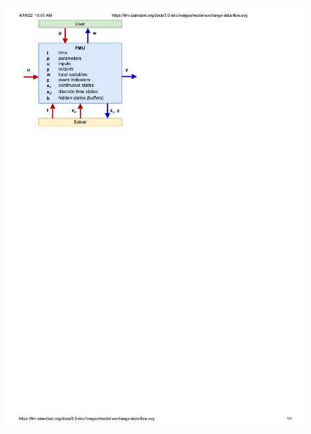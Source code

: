 \documentclass[journal,onecolumn]{IEEEtran} %
\begin{document}
\begin{figure}[hbt!]
    \centering
    \includegraphics[scale=0.6]{figures/fmi_me.pdf}

\end{figure}
\end{document}
